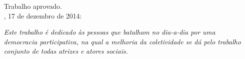 \documentclass[
  12pt,                                         %
  openright,                                   %
  openany,
  twoside,                                     %
  a4paper,                                      %
  english,                                      %
  brazil,                                       %
  ]{abntex2}
\begin{document}
%
% 
%
\begin{folhadeaprovacao}
  \begin{center}
    {\ABNTEXchapterfont\large\imprimirautor}

    \vspace*{\fill}\vspace*{\fill}
    \begin{center}
      \ABNTEXchapterfont\bfseries\Large\imprimirtitulo
    \end{center}
    \vspace*{\fill}

    \hspace{.45\textwidth}
    \begin{minipage}{.5\textwidth}
        \imprimirpreambulo
    \end{minipage}%
    \vspace*{\fill}

   Trabalho aprovado. \\
   \imprimirlocal, 17 de dezembro de 2014: 
   \end{center}


   \begin{center}
    \vspace*{0.5cm}
    {\large\imprimirlocal}
    \par
    {\large\imprimirdata}
    \vspace*{1cm}
  \end{center}
\end{folhadeaprovacao}

\begin{dedicatoria}
   \vspace*{\fill}
   \centering
   \noindent
   \textit{Este trabalho é dedicado às pessoas que batalham no dia-a-dia por uma democracia participativa, na qual a melhoria da coletividade se dá pelo trabalho conjunto de todas atrizes e atores sociais.} \vspace*{\fill} %
\end{dedicatoria}
\end{document}
